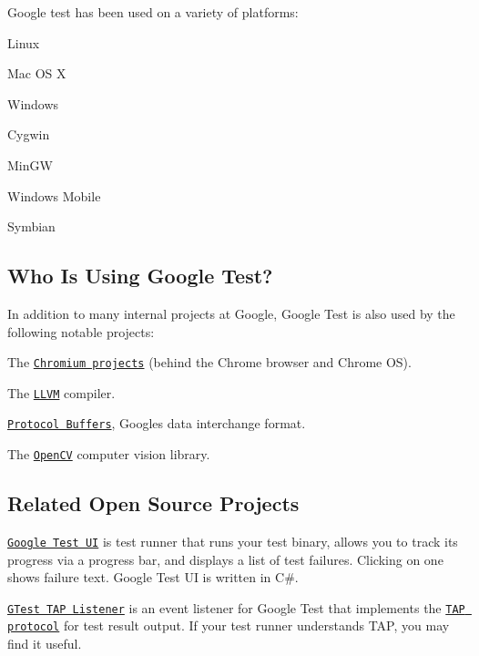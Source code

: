 Google test has been used on a variety of platforms\+:


\begin{DoxyItemize}
\item Linux
\item Mac OS X
\item Windows
\item Cygwin
\item Min\+GW
\item Windows Mobile
\item Symbian
\end{DoxyItemize}

\subsection*{Who Is Using Google Test?}

In addition to many internal projects at Google, Google Test is also used by the following notable projects\+:


\begin{DoxyItemize}
\item The \href{http://www.chromium.org/}{\tt Chromium projects} (behind the Chrome browser and Chrome OS).
\item The \href{http://llvm.org/}{\tt L\+L\+VM} compiler.
\item \href{https://github.com/google/protobuf}{\tt Protocol Buffers}, Google\textquotesingle{}s data interchange format.
\item The \href{http://opencv.org/}{\tt Open\+CV} computer vision library.
\end{DoxyItemize}

\subsection*{Related Open Source Projects}

\href{https://github.com/ospector/gtest-gbar}{\tt Google Test UI} is test runner that runs your test binary, allows you to track its progress via a progress bar, and displays a list of test failures. Clicking on one shows failure text. Google Test UI is written in C\#.

\href{https://github.com/kinow/gtest-tap-listener}{\tt G\+Test T\+AP Listener} is an event listener for Google Test that implements the \href{https://en.wikipedia.org/wiki/Test_Anything_Protocol}{\tt T\+AP protocol} for test result output. If your test runner understands T\+AP, you may find it useful.

